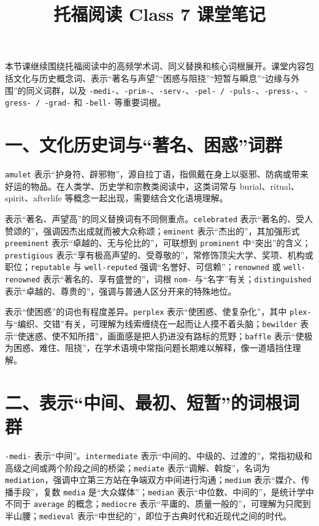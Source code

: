 \documentclass[UTF8,zihao=-4]{ctexart}
\title{\heiti 托福阅读 Class 7 课堂笔记}
\author{}
\date{}
\begin{document}
\maketitle
\thispagestyle{fancy}

本节课继续围绕托福阅读中的高频学术词、同义替换和核心词根展开。课堂内容包括文化与历史概念词、表示“著名与声望”“困惑与阻挠”“短暂与瞬息”“边缘与外围”的同义词群，以及 \texttt{-medi-}、\texttt{-prim-}、\texttt{-serv-}、\texttt{-pel- / -puls-}、\texttt{-press-}、\texttt{-gress- / -grad-} 和 \texttt{-bell-} 等重要词根。

\section*{一、文化历史词与“著名、困惑”词群}

\texttt{amulet} 表示“护身符、辟邪物”，源自拉丁语，指佩戴在身上以驱邪、防病或带来好运的物品。在人类学、历史学和宗教类阅读中，这类词常与 burial、ritual、spirit、afterlife 等概念一起出现，需要结合文化语境理解。

表示“著名、声望高”的同义替换词有不同侧重点。\texttt{celebrated} 表示“著名的、受人赞颂的”，强调因杰出成就而被大众称颂；\texttt{eminent} 表示“杰出的”，其加强形式 \texttt{preeminent} 表示“卓越的、无与伦比的”，可联想到 \texttt{prominent} 中“突出”的含义；\texttt{prestigious} 表示“享有极高声望的、受尊敬的”，常修饰顶尖大学、奖项、机构或职位；\texttt{reputable} 与 \texttt{well-reputed} 强调“名誉好、可信赖”；\texttt{renowned} 或 \texttt{well-renowned} 表示“著名的、享有盛誉的”，词根 \texttt{nom-} 与“名字”有关；\texttt{distinguished} 表示“卓越的、尊贵的”，强调与普通人区分开来的特殊地位。

表示“使困惑”的词也有程度差异。\texttt{perplex} 表示“使困惑、使复杂化”，其中 \texttt{plex-} 与“编织、交错”有关，可理解为线索缠绕在一起而让人摸不着头脑；\texttt{bewilder} 表示“使迷惑、使不知所措”，画面感是把人扔进没有路标的荒野；\texttt{baffle} 表示“使极为困惑、难住、阻挠”，在学术语境中常指问题长期难以解释，像一道墙挡住理解。

\section*{二、表示“中间、最初、短暂”的词根词群}

\texttt{-medi-} 表示“中间”。\texttt{intermediate} 表示“中间的、中级的、过渡的”，常指初级和高级之间或两个阶段之间的桥梁；\texttt{mediate} 表示“调解、斡旋”，名词为 \texttt{mediation}，强调中立第三方站在争端双方中间进行沟通；\texttt{medium} 表示“媒介、传播手段”，复数 \texttt{media} 是“大众媒体”；\texttt{median} 表示“中位数、中间的”，是统计学中不同于 \texttt{average} 的概念；\texttt{mediocre} 表示“平庸的、质量一般的”，可理解为只爬到半山腰；\texttt{medieval} 表示“中世纪的”，即位于古典时代和近现代之间的时代。
\end{document}

